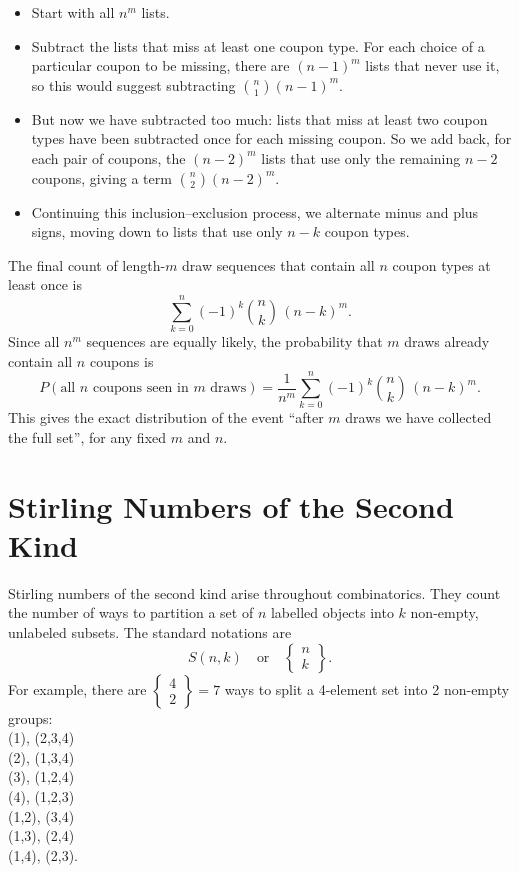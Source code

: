 \begin{itemize}
  \item Start with all \(n^m\) lists.
  \item Subtract the lists that miss at least one coupon type.  For each choice
        of a particular coupon to be missing, there are \((n-1)^m\) lists that
        never use it, so this would suggest subtracting
        \(\binom{n}{1}(n-1)^m\).
  \item But now we have subtracted too much: lists that miss at least two
        coupon types have been subtracted once for each missing coupon.  So we
        add back, for each pair of coupons, the \((n-2)^m\) lists that use only
        the remaining \(n-2\) coupons, giving a term
        \(\binom{n}{2}(n-2)^m\).
  \item Continuing this inclusion--exclusion process, we alternate minus and
        plus signs, moving down to lists that use only \(n-k\) coupon types.
\end{itemize}

The final count of length-\(m\) draw sequences that contain all \(n\) coupon
types at least once is
\[
  \sum_{k=0}^{n} (-1)^k \binom{n}{k}\,(n-k)^m.
\]
Since all \(n^m\) sequences are equally likely, the probability that \(m\)
draws already contain all \(n\) coupons is
\[
  P(\text{all $n$ coupons seen in $m$ draws})
  = \frac{1}{n^m}
    \sum_{k=0}^{n} (-1)^k \binom{n}{k}\,(n-k)^m.
\]
This gives the exact distribution of the event ``after \(m\) draws we have
collected the full set'', for any fixed \(m\) and \(n\).

\section{Stirling Numbers of the Second Kind}
Stirling numbers of the second kind\cite{wiki:stirling-second-kind} arise
throughout combinatorics.  They count the number of ways to partition a set of
\(n\) labelled objects into \(k\) non-empty, unlabeled subsets.  The standard
notations are
\[
  S(n,k) \quad \text{or} \quad \left\{\begin{matrix}n\\k\end{matrix}\right\}.
\]
For example, there are
\(\left\{\begin{smallmatrix}4\\2\end{smallmatrix}\right\}=7\) ways to split a
4-element set into 2 non-empty groups: \\
(1), (2,3,4)\\
(2), (1,3,4)\\
(3), (1,2,4)\\
(4), (1,2,3)\\
(1,2), (3,4)\\
(1,3), (2,4)\\
(1,4), (2,3).

